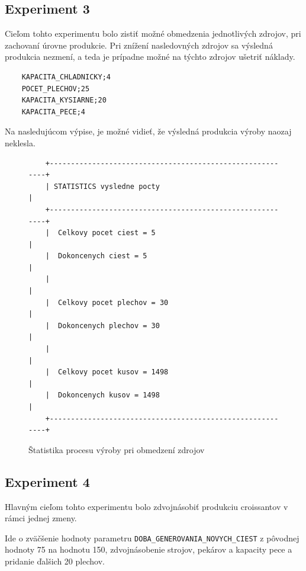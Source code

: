\documentclass[11pt]{article}
\begin{document}
\subsection{Experiment 3}
\label{exp:resources_limitation}
Cieľom tohto experimentu bolo zistiť možné obmedzenia jednotlivých zdrojov, pri zachovaní úrovne produkcie. Pri znížení nasledovných zdrojov sa výsledná produkcia nezmení, a teda je prípadne možné na týchto zdrojov ušetriť náklady.

\begin{verbatim}
    KAPACITA_CHLADNICKY;4
    POCET_PLECHOV;25
    KAPACITA_KYSIARNE;20
    KAPACITA_PECE;4
\end{verbatim}

Na nasledujúcom výpise, je možné vidieť, že výsledná produkcia výroby naozaj neklesla.

\begin{figure}[H]
\begin{verbatim}
    +----------------------------------------------------------+
    | STATISTICS vysledne pocty                                |
    +----------------------------------------------------------+
    |  Celkovy pocet ciest = 5                                 |
    |  Dokoncenych ciest = 5                                   |
    |                                                          |
    |  Celkovy pocet plechov = 30                              |
    |  Dokoncenych plechov = 30                                |
    |                                                          |
    |  Celkovy pocet kusov = 1498                              |
    |  Dokoncenych kusov = 1498                                |
    +----------------------------------------------------------+
\end{verbatim}
\caption{Štatistika procesu výroby pri obmedzení zdrojov}
\label{fig:resources_limatation_experiment}
\end{figure}

\subsection{Experiment 4}
\label{exp:mixer_failure_experiment}
Hlavným cieľom tohto experimentu bolo zdvojnásobiť produkciu croissantov v rámci jednej zmeny.

Ide o zväčšenie hodnoty parametru \texttt{DOBA\_GENEROVANIA\_NOVYCH\_CIEST} z pôvodnej hodnoty 75 na hodnotu 150, zdvojnásobenie strojov, pekárov a kapacity pece a pridanie ďalšich 20 plechov.
\end{document}
